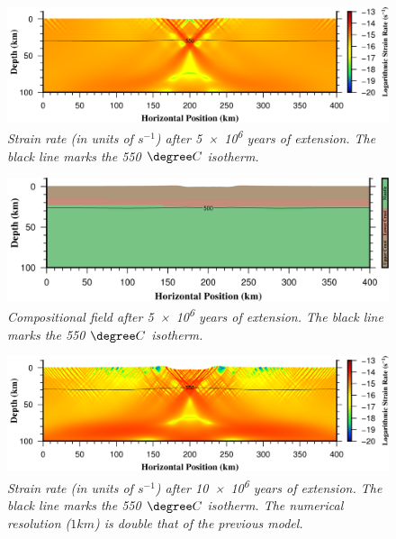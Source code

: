 \documentclass{article}
\begin{document}
\begin{figure}
\centering
\includegraphics[width=\textwidth]{cookbooks/continental_extension/continental_extension_cookbook_strainrate_5e6yr.png}
\caption{\it Strain rate (in units of $s^{-1}$) after \num{5e6} years of extension. The black line marks the 550 $\degree C$ isotherm.} 
\label{fig:continental_extension_cookbook_strainrate_5e6yr}
\end{figure}
\begin{figure}
\includegraphics[width=\textwidth]{cookbooks/continental_extension/continental_extension_cookbook_composition_5e6yr.png}
\caption{\it Compositional field after \num{5e6} years of extension. The black line marks the 550 $\degree C$ isotherm.} 
\label{fig:continental_extension_cookbook_composition_5e6yr}
\end{figure}
\begin{figure}
\includegraphics[width=\textwidth]{cookbooks/continental_extension/continental_extension_cookbook_strainrate_highres_10e6yr.png}
\caption{\it Strain rate (in units of $s^{-1}$) after \num{10e6} years of extension. The black line marks the 550 $\degree C$ isotherm. The numerical resolution ($1 \si{km}$) is double that of the previous model.} 
\label{fig:continental_extension_cookbook_strainrate_highres_10e6yr}
\end{figure}
 
\end{document}
